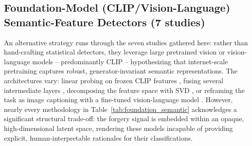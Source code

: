 \documentclass[sn-mathphys-num,Numbered,pdflatex]{sn-jnl}
\begin{document}
\subsection{Foundation-Model (CLIP/Vision-Language) Semantic-Feature Detectors (7 studies)}
An alternative strategy runs through the seven studies gathered here: rather than hand-crafting statistical detectors, they leverage large pretrained vision or vision-language models -- predominantly CLIP -- hypothesizing that internet-scale pretraining captures robust, generator-invariant semantic representations. The architectures vary: linear probing on frozen CLIP features \cite{TowardsUniversal19}, fusing several intermediate layers \cite{LeveragingRepresentations23}, decomposing the feature space with SVD \cite{OrthogonalSubspace22}, or reframing the task as image captioning with a fine-tuned vision-language model \cite{BiloraA25}. However, nearly every methodology in Table~\ref{tab:foundation_semantic} acknowledges a significant structural trade-off: the forgery signal is embedded within an opaque, high-dimensional latent space, rendering these models incapable of providing explicit, human-interpretable rationales for their classifications.
\end{document}

